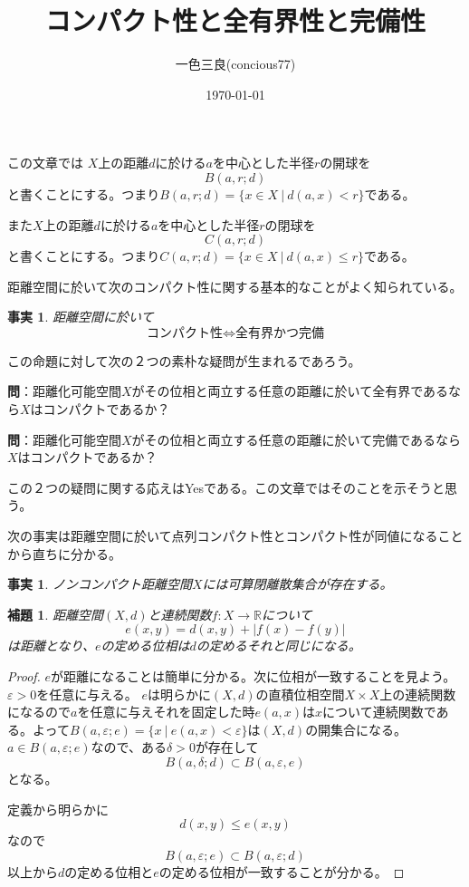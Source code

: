 \documentclass[leqno]{jsarticle}
\title{コンパクト性と全有界性と完備性}
\author{一色三良(concious77)}
\date{\today}
\newtheorem{lem}[thm]{補題}
\newtheorem{fact}[thm]{事実}
\newcommand{\rr}{\mathbb{R}}
\newcommand{\ep}{\varepsilon}
\begin{document}
\maketitle
この文章では
$X$上の距離$d$に於ける$a$を中心とした半径$r$の開球を
\[
B(a,r;d)
\]
と書くことにする。つまり$B(a,r;d)=\{x\in X\ |\ d(a,x)<r\}$である。\par
また$X$上の距離$d$に於ける$a$を中心とした半径$r$の閉球を
\[
C(a,r;d)
\]
と書くことにする。つまり$C(a,r;d)=\{x\in X\ |\ d(a,x)\le r\}$である。\par
距離空間に於いて次のコンパクト性に関する基本的なことがよく知られている。
\begin{fact}
距離空間に於いて
\[
\mbox{コンパクト性$\iff$全有界かつ完備}
\]
\end{fact}
この命題に対して次の２つの素朴な疑問が生まれるであろう。\par
{\bf 問}：距離化可能空間$X$がその位相と両立する任意の距離に於いて全有界であるなら$X$はコンパクトであるか？

{\bf 問}：距離化可能空間$X$がその位相と両立する任意の距離に於いて完備であるなら$X$はコンパクトであるか？

この２つの疑問に関する応えはYesである。この文章ではそのことを示そうと思う。\par
次の事実は距離空間に於いて点列コンパクト性とコンパクト性が同値になることから直ちに分かる。
\begin{fact}\label{risan}
ノンコンパクト距離空間$X$には可算閉離散集合が存在する。
\end{fact}



\begin{lem}\label{kansu}
距離空間$(X,d)$と連続関数$f:X\to \rr$について
\[
e(x,y)=d(x,y)+|f(x)-f(y)|
\]
は距離となり、$e$の定める位相は$d$の定めるそれと同じになる。
\end{lem}
\begin{proof}$e$が距離になることは簡単に分かる。次に位相が一致することを見よう。
$\ep>0$を任意に与える。
$e$は明らかに$(X,d)$の直積位相空間$X\times X$上の連続関数になるので$a$を任意に与えそれを固定した時$e(a,x)$は$x$について連続関数である。よって$B(a,\ep;e)=\{x\ |\ e(a,x)<\ep\}$は$(X,d)$の開集合になる。$a\in B(a,\ep;e)$なので、ある$\delta>0$が存在して
\[
B(a,\delta;d)\subset B(a,\ep,e)
\]
となる。\par
定義から明らかに
\[
d(x,y)\le e(x,y)
\]
なので
\[
B(a,\ep;e)\subset B(a,\ep;d)
\]
以上から$d$の定める位相と$e$の定める位相が一致することが分かる。
\end{proof}
\end{document}
